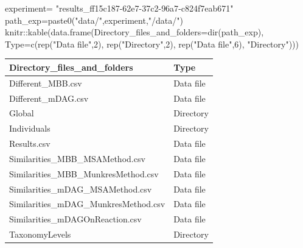 \documentclass[
  letterpaper,
  DIV=11,
  numbers=noendperiod]{scrreprt}
\newenvironment{Shaded}{\begin{snugshade}}{\end{snugshade}}
\newcommand{\AttributeTok}[1]{\textcolor[rgb]{0.40,0.45,0.13}{#1}}
\newcommand{\DecValTok}[1]{\textcolor[rgb]{0.68,0.00,0.00}{#1}}
\newcommand{\FunctionTok}[1]{\textcolor[rgb]{0.28,0.35,0.67}{#1}}
\newcommand{\NormalTok}[1]{\textcolor[rgb]{0.00,0.23,0.31}{#1}}
\newcommand{\OtherTok}[1]{\textcolor[rgb]{0.00,0.23,0.31}{#1}}
\newcommand{\SpecialCharTok}[1]{\textcolor[rgb]{0.37,0.37,0.37}{#1}}
\newcommand{\StringTok}[1]{\textcolor[rgb]{0.13,0.47,0.30}{#1}}
\begin{document}

\begin{Shaded}
\begin{Highlighting}[]
\NormalTok{experiment}\OtherTok{=}
  \StringTok{"results\_ff15c187{-}62e7{-}37c2{-}96a7{-}c824f7eab671"}
\NormalTok{path\_exp}\OtherTok{=}\FunctionTok{paste0}\NormalTok{(}\StringTok{"data/"}\NormalTok{,experiment,}\StringTok{"/data/"}\NormalTok{)}
\NormalTok{knitr}\SpecialCharTok{::}\FunctionTok{kable}\NormalTok{(}\FunctionTok{data.frame}\NormalTok{(}\AttributeTok{Directory\_files\_and\_folders=}\FunctionTok{dir}\NormalTok{(path\_exp),}
                        \AttributeTok{Type=}\FunctionTok{c}\NormalTok{(}\FunctionTok{rep}\NormalTok{(}\StringTok{"Data file"}\NormalTok{,}\DecValTok{2}\NormalTok{),}
                       \FunctionTok{rep}\NormalTok{(}\StringTok{"Directory"}\NormalTok{,}\DecValTok{2}\NormalTok{),}
                       \FunctionTok{rep}\NormalTok{(}\StringTok{"Data file"}\NormalTok{,}\DecValTok{6}\NormalTok{),}
                       \StringTok{"Directory"}\NormalTok{)))}
\end{Highlighting}
\end{Shaded}

\begin{tabular}{l|l}
\hline
Directory\_files\_and\_folders & Type\\
\hline
Different\_MBB.csv & Data file\\
\hline
Different\_mDAG.csv & Data file\\
\hline
Global & Directory\\
\hline
Individuals & Directory\\
\hline
Results.csv & Data file\\
\hline
Similarities\_MBB\_MSAMethod.csv & Data file\\
\hline
Similarities\_MBB\_MunkresMethod.csv & Data file\\
\hline
Similarities\_mDAG\_MSAMethod.csv & Data file\\
\hline
Similarities\_mDAG\_MunkresMethod.csv & Data file\\
\hline
Similarities\_mDAGOnReaction.csv & Data file\\
\hline
TaxonomyLevels & Directory\\
\hline
\end{tabular}
\end{document}
